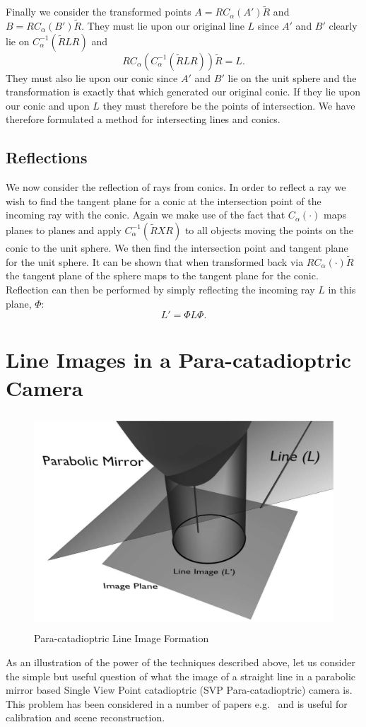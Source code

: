 Finally we consider the transformed points $A = RC_\alpha(A')\tilde{R}$
and
$B = RC_\alpha(B')\tilde{R}$. They must lie upon our original line 
$L$ since
$A'$ and $B'$ clearly lie on $C_\alpha^{-1}(\tilde{R}LR)$ and 
\[ RC_\alpha(C_\alpha^{-1}(\tilde{R}LR))\tilde{R} = L. \]
They must also lie upon our conic since $A'$ and $B'$ lie on the unit sphere
and the transformation is exactly that which generated our original conic.
If they lie upon our conic and upon $L$ they must therefore be the points
of intersection.
We have therefore formulated a method for intersecting lines and conics. 

\subsection{Reflections}
\label{sec:Ref}
We now consider the reflection of rays from conics. In order to
reflect a ray we wish to find the tangent plane for a conic at the 
intersection point of the incoming ray with the conic. Again we
make use of the fact that $C_\alpha(\cdot)$ maps planes to
planes and apply $C_\alpha^{-1}(\tilde{R}XR)$ to all objects moving the
points on the conic to the unit sphere. We then find the intersection
point and tangent plane for the unit sphere. It can be shown \cite{jic23fyr}
that when transformed back via $RC_\alpha(\cdot)\tilde{R}$ the tangent
plane of the sphere maps to the tangent plane for the conic. Reflection
can then be performed by simply reflecting the incoming ray $L$ in
this plane, $\Phi$:
\[
L' = \Phi L \Phi.
\]
\section{Line Images in a Para-catadioptric Camera}
\begin{figure}[ht]
\includegraphics[height=8cm]{testparaboloid2}
\caption{Para-catadioptric Line Image Formation}
\label{fig:bob}
\end{figure}
As an illustration of the power of the techniques described above, let us consider the simple but
 useful question of what the image of a straight line in a parabolic mirror based Single View Point 
catadioptric (SVP Para-catadioptric) camera is.  This problem has been considered in a number 
of papers e.g.\ \cite{CAM:gd, CAM:YH04, CAM:BA03b, CAM:bclf} and is useful for calibration 
and scene reconstruction.


